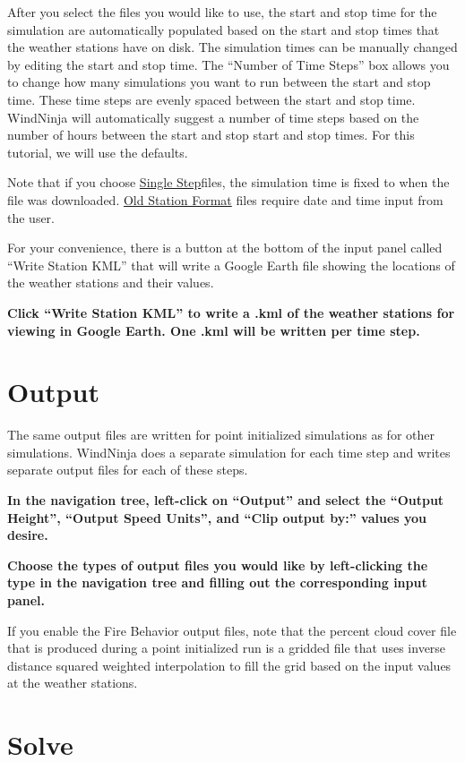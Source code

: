 \documentclass[12pt]{article}
\begin{document}
After you select the files you would like to use, the start and stop time for the simulation are automatically populated based on the start and stop times that the weather stations have on disk. The simulation times can be manually changed by editing the start and stop time. The “Number of Time Steps” box allows you to change how many simulations you want to run between the start and stop time. These time steps are evenly spaced between the start and stop time.  WindNinja will automatically suggest a number of time steps based on the number of hours between the start and stop start and stop times.  For this tutorial, we will use the defaults.

Note that if you choose \underline{Single Step}files, the simulation time is fixed to when the file was downloaded. \underline{Old Station Format} files require date and time input from the user.

For your convenience, there is a button at the bottom of the input panel called “Write Station KML” that will write a Google Earth file showing the locations of the weather stations and their values.

\textbf{\color{red} Click “Write Station KML” to write a .kml of the weather stations for viewing in Google Earth. One .kml will be written per time step.}

\section{Output}

The same output files are written for point initialized simulations as for other simulations. WindNinja does a separate simulation for each time step and writes separate output files for each of these steps.

\textbf{\color{red} In the navigation tree, left-click on “Output” and select the “Output Height”, “Output Speed Units”, and  “Clip output by:” values you desire.}

\textbf{\color{red} Choose the types of output files you would like by left-clicking the type in the navigation tree and filling out the corresponding input panel.}

If you enable the Fire Behavior output files, note that the percent cloud cover file that is produced during a point initialized run is a gridded file that uses inverse distance squared weighted interpolation to fill the grid based on the input values at the weather stations.

\section{Solve}
\end{document}
